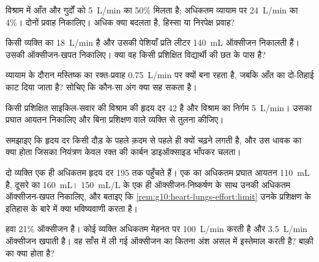 \begin{exercise}[$\star\star$]\label{exo:g10:heart-lungs-effort:7}
विश्राम में आँत और गुर्दों को \qty{5}{L/min} का 50\% मिलता है; अधिकतम
व्यायाम पर \qty{24}{L/min} का 4\%। दोनों प्रवाह निकालिए। अधिक क्या बदलता
है, हिस्सा या निरपेक्ष प्रवाह?
\end{exercise}

\begin{exercise}[$\star\star$]\label{exo:g10:heart-lungs-effort:8}
किसी व्यक्ति का  \qty{18}{L/min} है और उसकी पेशियाँ प्रति
लीटर \qty{140}{mL} ऑक्सीजन निकालती हैं। उसकी ऑक्सीजन-खपत निकालिए। क्या
वह किसी प्रशिक्षित विद्यार्थी की छत के पास है?
\end{exercise}

\begin{exercise}[$\star\star$]\label{exo:g10:heart-lungs-effort:9}
व्यायाम के दौरान मस्तिष्क का रक्त-प्रवाह \qty{0.75}{L/min} पर क्यों बना
रहता है, जबकि आँत का दो-तिहाई काट दिया जाता है? सोचिए कि कौन-सा अंग
क्या सह सकता है।
\end{exercise}

\begin{exercise}[$\star\star$]\label{exo:g10:heart-lungs-effort:10}
किसी प्रशिक्षित साइकिल-सवार की विश्राम की हृदय दर 42 है और विश्राम का
निर्गम \qty{5}{L/min}। उसका प्रघात आयतन निकालिए और बिना प्रशिक्षण वाले
व्यक्ति से तुलना कीजिए।
\end{exercise}

\begin{exercise}[$\star\star$]\label{exo:g10:heart-lungs-effort:11}
समझाइए कि हृदय दर किसी दौड़ के पहले क़दम से पहले ही क्यों चढ़ने लगती है,
और उस धावक का क्या होता जिसका नियंत्रण केवल रक्त की कार्बन डाइऑक्साइड
भाँपकर चलता।
\end{exercise}

\begin{exercise}[$\star\star\star$]\label{exo:g10:heart-lungs-effort:12}
दो व्यक्ति एक ही अधिकतम हृदय दर 195 तक पहुँचते हैं। एक का अधिकतम प्रघात
आयतन \qty{110}{mL} है, दूसरे का \qty{160}{mL}। \qty{150}{mL/L} के एक ही
ऑक्सीजन-निष्कर्षण के साथ उनकी अधिकतम ऑक्सीजन-खपत निकालिए, और बताइए कि
\cref{rem:g10:heart-lungs-effort:limit} उनके प्रशिक्षण के इतिहास के बारे
में क्या भविष्यवाणी करता है।
\end{exercise}

\begin{exercise}[$\star\star\star$]\label{exo:g10:heart-lungs-effort:13}
हवा 21\% ऑक्सीजन है। कोई व्यक्ति अधिकतम मेहनत पर \qty{100}{L/min} 
करती है और \qty{3.5}{L/min} ऑक्सीजन खपाती है। वह साँस में ली गई ऑक्सीजन
का कितना अंश असल में इस्तेमाल करती है? बाक़ी का क्या होता है?
\end{exercise}

